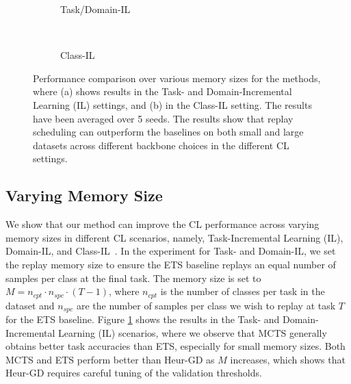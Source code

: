 \begin{figure}[t]
	\centering
	\setlength{\figwidth}{0.35\textwidth}
	\setlength{\figheight}{.16\textheight}
	\begin{subfigure}[b]{0.9\textwidth}
		\centering
		
		\vspace{-1mm}
		\caption{Task/Domain-IL}
		\label{fig:acc_over_memory_size_task_il}
	\end{subfigure} \\
	\begin{subfigure}[b]{0.9\textwidth}
		\centering
		
		\vspace{-1mm}
		\caption{Class-IL}
		\label{fig:acc_over_memory_size_class_il}
	\end{subfigure}
	\vspace{-1mm}
	\caption{Performance comparison over various memory sizes for the methods, where (a) shows results in the Task- and Domain-Incremental Learning (IL) settings, and (b) in the Class-IL setting. The results have been averaged over 5 seeds. The results show that replay scheduling can outperform the baselines on both small and large datasets across different backbone choices in the different CL settings. 
	}
	\label{fig:acc_over_replay_memory_size}
\end{figure}

%
\subsection{Varying Memory Size}
\label{paperC:sec:results_with_varying_replay_memory_size}

We show that our method can improve the CL performance across varying memory sizes in different CL scenarios, namely, Task-Incremental Learning (IL), Domain-IL, and Class-IL~\cite{van2019three}. In the experiment for Task- and Domain-IL, we set the replay memory size to ensure the ETS baseline replays an equal number of samples per class at the final task. The memory size is set to $M = n_{cpt} \cdot n_{spc} \cdot (T-1)$, where $n_{cpt}$ is the number of classes per task in the dataset and $n_{spc}$ are the number of samples per class we wish to replay at task $T$ for the ETS baseline. Figure \ref{fig:acc_over_memory_size_task_il} shows the results in the Task- and Domain-Incremental Learning (IL) scenarios, where we observe that MCTS generally obtains better task accuracies than ETS, especially for small memory sizes. Both MCTS and ETS perform better than Heur-GD as $M$ increases, which shows that Heur-GD requires careful tuning of the validation thresholds. 

